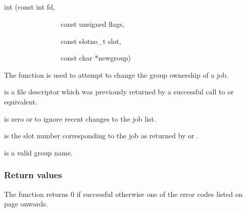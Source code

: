 \subsection{\funcnameXBjobchgrp{}}

\begin{expara}

int \funcnameXBjobchgrp{}(const int fd,

\ \ \ \ \ \ \ \ \ \ \ \ \ \ \ \ const unsigned flags,

\ \ \ \ \ \ \ \ \ \ \ \ \ \ \ \ const slotno\_t slot,

\ \ \ \ \ \ \ \ \ \ \ \ \ \ \ \ const char *newgroup)

\end{expara}

The function \funcXBjobchgrp{} is used to attempt to
change the group ownership of a job.

 is a file descriptor which was previously
returned by a successful call to \funcXBopen{} or equivalent.

 is zero or
 to ignore recent changes to
the job list.

 is the slot number corresponding to the job
as returned by \funcXBjoblist{} or
\funcXBjobfindslot{}.

 is a valid group name.

\subsubsection{Return values}
The function returns 0 if successful otherwise one of the error codes
listed on page \pageref{errorcodes} onwards.


